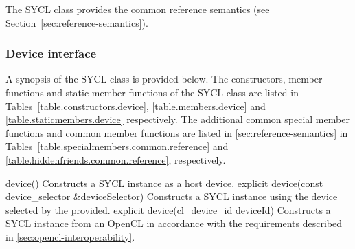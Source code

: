 The SYCL  class provides the common reference semantics
(see Section~\ref{sec:reference-semantics}).

\subsubsection{Device interface}

A synopsis of the SYCL  class is provided below. The constructors, member functions and static member functions of the SYCL  class are listed in Tables~\ref{table.constructors.device}, \ref{table.members.device} and \ref{table.staticmembers.device} respectively. The additional common special member functions and common member functions are listed in \ref{sec:reference-semantics} in Tables~\ref{table.specialmembers.common.reference} and \ref{table.hiddenfriends.common.reference}, respectively.


  \addRow
    {device()}
    {
      Constructs a SYCL  instance as a host device.
    }
  \addRow
    {explicit device(const device_selector \&deviceSelector)}
    {
      Constructs a SYCL  instance using the device selected by the  provided.
    }
  \addRow
    {explicit device(cl_device_id deviceId)}
    {    
     Constructs a SYCL  instance from an OpenCL  in accordance with the requirements described in \ref{sec:opencl-interoperability}.
    }
\completeTable


